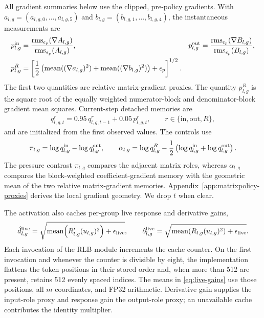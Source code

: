 \documentclass{article}
\newcommand{\rms}{\operatorname{rms}}
\begin{document}
All gradient summaries below use the clipped, pre-policy gradients.  With
$a_{l,g}=(a_{l,g,0},\ldots,a_{l,g,5})$ and
$b_{l,g}=(b_{l,g,1},\ldots,b_{l,g,4})$, the instantaneous measurements are
\begin{align}
    p^{\rm in}_{l,g}
    &=
    \frac{\rms_{\epsilon_p}(\nabla A_{l,g})}
    {\rms_{\epsilon_p}(A_{l,g})},
    &
    p^{\rm out}_{l,g}
    &=
    \frac{\rms_{\epsilon_p}(\nabla B_{l,g})}
    {\rms_{\epsilon_p}(B_{l,g})},
    \label{eq:matrix-pressure}\\
    p^{R}_{l,g}
    &=
    \left[
    \frac{1}{2}
    \left(
    \operatorname{mean}((\nabla a_{l,g})^2)
    +
    \operatorname{mean}((\nabla b_{l,g})^2)
    \right)
    +\epsilon_p
    \right]^{1/2}.
    \label{eq:rational-activity-raw}
\end{align}
The first two quantities are relative matrix-gradient proxies.  The quantity
$p^R_{l,g}$ is the square root of the equally weighted numerator-block and
denominator-block gradient mean squares.  Current-step detached memories are
\begin{align}
    q^{r}_{l,g,t}
    =
    0.95\,q^{r}_{l,g,t-1}+0.05\,p^{r}_{l,g,t},
    \qquad
    r\in\{\mathrm{in},\mathrm{out},R\},
    \label{eq:pressure-ema}
\end{align}
and are initialized from the first observed values.  The controls use
\begin{align}
    \pi_{l,g}
    =
    \log q^{\rm in}_{l,g}-\log q^{\rm out}_{l,g},
    \qquad
    \alpha_{l,g}
    =
    \log q^{R}_{l,g}
    -\frac{1}{2}\left(\log q^{\rm in}_{l,g}+\log q^{\rm out}_{l,g}\right).
    \label{eq:pressure-activity}
\end{align}
The pressure contrast $\pi_{l,g}$ compares the adjacent matrix roles, whereas
$\alpha_{l,g}$ compares the block-weighted coefficient-gradient memory with the
geometric mean of the two relative matrix-gradient memories.
Appendix~\ref{app:matrixpolicy-proxies} derives the local gradient geometry.  We
drop $t$ when clear.

The activation also caches per-group live response and derivative gains,
\begin{align}
    \hat d^{\rm live}_{l,g}
    =
    \sqrt{\operatorname{mean}\!\left(R'_{l,g}(u_{l,g})^2\right)+\epsilon_{\rm live}},
    \qquad
    \hat o^{\rm live}_{l,g}
    =
    \sqrt{\operatorname{mean}\!\left(R_{l,g}(u_{l,g})^2\right)+\epsilon_{\rm live}}.
    \label{eq:live-gains}
\end{align}
Each invocation of the RLB module increments the cache counter.  On the first
invocation and whenever the counter is divisible by eight, the implementation
flattens the token positions in their stored order and, when more than 512 are
present, retains 512 evenly spaced indices.  The means in
\eqref{eq:live-gains} use those positions, all $m$ coordinates, and FP32
arithmetic.  Derivative gain supplies the input-role proxy and response gain
the output-role proxy; an unavailable cache contributes the identity
multiplier.
\end{document}
